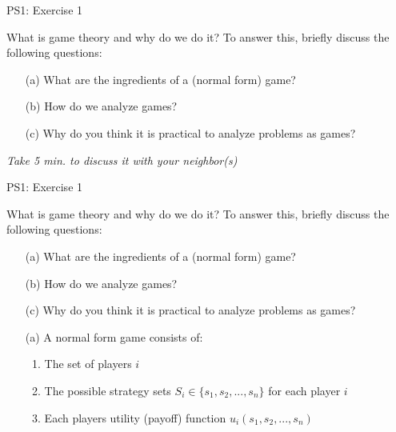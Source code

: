\begin{frame}{PS1: Exercise 1}
\begin{multicols}{2}
What is game theory and why do we do it? To answer this, briefly discuss the following questions:
\begin{itemize}
  \item[(a)] What are the ingredients of a (normal form) game?
  \item[(b)] How do we analyze games?
  \item[(c)] Why do you think it is practical to analyze problems as games?
\end{itemize}
\vfill\null \columnbreak
\textit{Take 5 min. to discuss it with your neighbor(s)}
\vfill\null
\end{multicols}
\end{frame}

\begin{frame}{PS1: Exercise 1}
\begin{multicols}{2}
What is game theory and why do we do it? To answer this, briefly discuss the following questions:
\begin{itemize}
  \item[(a)] What are the ingredients of a (normal form) game?
  \item[(b)] How do we analyze games?
  \item[(c)] Why do you think it is practical to analyze problems as games?
\end{itemize}
\vfill\null \columnbreak
\begin{itemize}
  \item[(a)] A normal form game consists of:
    \begin{enumerate}
      \item The set of players $i$
      \item The possible strategy sets $S_i\in \{s_1,s_2,...,s_n\}$ for each player $i$
      \item Each players utility (payoff) function $u_i(s_1,s_2,...,s_n)$
    \end{enumerate}
\end{itemize}
\vfill\null
\end{multicols}
\end{frame}

